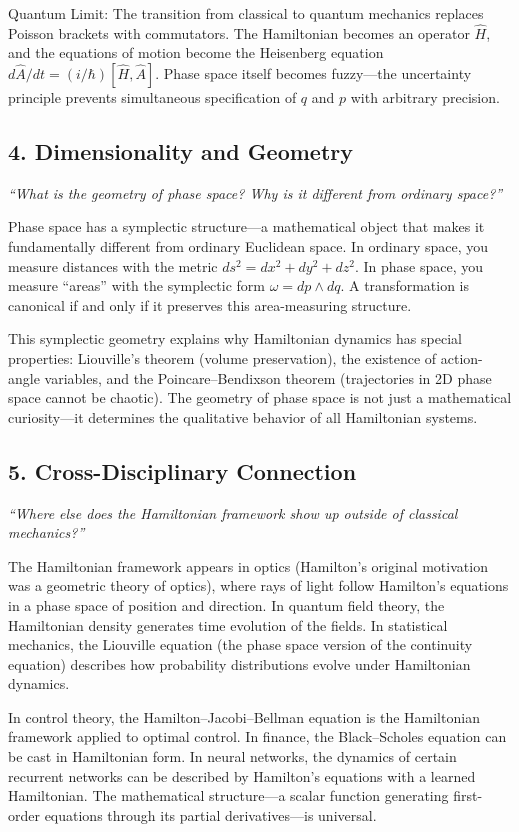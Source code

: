 Quantum Limit: The transition from classical to quantum mechanics replaces Poisson brackets with commutators. The Hamiltonian becomes an operator $\hat{H}$, and the equations of motion become the Heisenberg equation $d\hat{A}/dt = (i/\hbar)[\hat{H}, \hat{A}]$. Phase space itself becomes fuzzy---the uncertainty principle prevents simultaneous specification of $q$ and $p$ with arbitrary precision.

\subsection*{4. Dimensionality and Geometry}
\textit{``What is the geometry of phase space? Why is it different from ordinary space?''}

Phase space has a symplectic structure---a mathematical object that makes it fundamentally different from ordinary Euclidean space. In ordinary space, you measure distances with the metric $ds^2 = dx^2 + dy^2 + dz^2$. In phase space, you measure ``areas'' with the symplectic form $\omega = dp \wedge dq$. A transformation is canonical if and only if it preserves this area-measuring structure.

This symplectic geometry explains why Hamiltonian dynamics has special properties: Liouville's theorem (volume preservation), the existence of action-angle variables, and the Poincare--Bendixson theorem (trajectories in 2D phase space cannot be chaotic). The geometry of phase space is not just a mathematical curiosity---it determines the qualitative behavior of all Hamiltonian systems.

\subsection*{5. Cross-Disciplinary Connection}
\textit{``Where else does the Hamiltonian framework show up outside of classical mechanics?''}

The Hamiltonian framework appears in optics (Hamilton's original motivation was a geometric theory of optics), where rays of light follow Hamilton's equations in a phase space of position and direction. In quantum field theory, the Hamiltonian density generates time evolution of the fields. In statistical mechanics, the Liouville equation (the phase space version of the continuity equation) describes how probability distributions evolve under Hamiltonian dynamics.

In control theory, the Hamilton--Jacobi--Bellman equation is the Hamiltonian framework applied to optimal control. In finance, the Black--Scholes equation can be cast in Hamiltonian form. In neural networks, the dynamics of certain recurrent networks can be described by Hamilton's equations with a learned Hamiltonian. The mathematical structure---a scalar function generating first-order equations through its partial derivatives---is universal.

